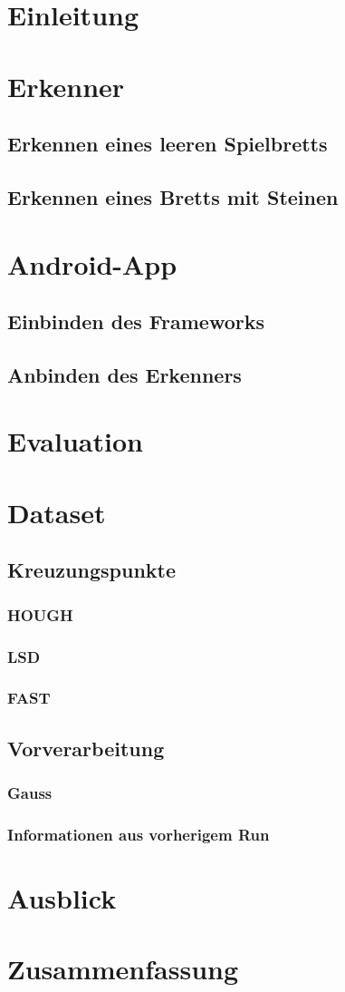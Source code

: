 \chapter{Einleitung}
\chapter{Erkenner}
	\section{Erkennen eines leeren Spielbretts}
	\section{Erkennen eines Bretts mit Steinen}
\chapter{Android-App}
	\section{Einbinden des Frameworks}
	\section{Anbinden des Erkenners}
\chapter{Evaluation}
	\chapter{Dataset}
	\section{Kreuzungspunkte}
		\subsection{HOUGH}
		\subsection{LSD}
		\subsection{FAST}
	\section{Vorverarbeitung}
		\subsection{Gauss}
		\subsection{Informationen aus vorherigem Run}
\chapter{Ausblick}
\chapter{Zusammenfassung}
